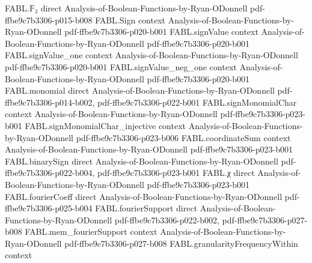 \begin{theorem}
\label{FABL.BooleanCircuit.satisfiable_iff_toWidthThreeCNF_satisfiable}
\leanok
{}
\proofstep
  {FABL.𝔽₂}
  {direct}
  {Analysis-of-Boolean-Functions-by-Ryan-ODonnell}
  {pdf-ffbe9c7b3306-p015-b008}
\proofstep
  {FABL.Sign}
  {context}
  {Analysis-of-Boolean-Functions-by-Ryan-ODonnell}
  {pdf-ffbe9c7b3306-p020-b001}
\proofstep
  {FABL.signValue}
  {context}
  {Analysis-of-Boolean-Functions-by-Ryan-ODonnell}
  {pdf-ffbe9c7b3306-p020-b001}
\proofstep
  {FABL.signValue_one}
  {context}
  {Analysis-of-Boolean-Functions-by-Ryan-ODonnell}
  {pdf-ffbe9c7b3306-p020-b001}
\proofstep
  {FABL.signValue_neg_one}
  {context}
  {Analysis-of-Boolean-Functions-by-Ryan-ODonnell}
  {pdf-ffbe9c7b3306-p020-b001}
\proofstep
  {FABL.monomial}
  {direct}
  {Analysis-of-Boolean-Functions-by-Ryan-ODonnell}
  {pdf-ffbe9c7b3306-p014-b002,
    pdf-ffbe9c7b3306-p022-b001}
\proofstep
  {FABL.signMonomialChar}
  {context}
  {Analysis-of-Boolean-Functions-by-Ryan-ODonnell}
  {pdf-ffbe9c7b3306-p023-b001}
\proofstep
  {FABL.signMonomialChar_injective}
  {context}
  {Analysis-of-Boolean-Functions-by-Ryan-ODonnell}
  {pdf-ffbe9c7b3306-p023-b006}
\proofstep
  {FABL.coordinateSum}
  {context}
  {Analysis-of-Boolean-Functions-by-Ryan-ODonnell}
  {pdf-ffbe9c7b3306-p023-b001}
\proofstep
  {FABL.binarySign}
  {direct}
  {Analysis-of-Boolean-Functions-by-Ryan-ODonnell}
  {pdf-ffbe9c7b3306-p022-b004,
    pdf-ffbe9c7b3306-p023-b001}
\proofstep
  {FABL.χ}
  {direct}
  {Analysis-of-Boolean-Functions-by-Ryan-ODonnell}
  {pdf-ffbe9c7b3306-p023-b001}
\proofstep
  {FABL.fourierCoeff}
  {direct}
  {Analysis-of-Boolean-Functions-by-Ryan-ODonnell}
  {pdf-ffbe9c7b3306-p025-b004}
\proofstep
  {FABL.fourierSupport}
  {direct}
  {Analysis-of-Boolean-Functions-by-Ryan-ODonnell}
  {pdf-ffbe9c7b3306-p022-b002,
    pdf-ffbe9c7b3306-p027-b008}
\proofstep
  {FABL.mem_fourierSupport}
  {context}
  {Analysis-of-Boolean-Functions-by-Ryan-ODonnell}
  {pdf-ffbe9c7b3306-p027-b008}
\proofstep
  {FABL.granularityFrequencyWithin}
  {context}

\end{theorem}

